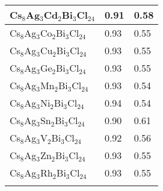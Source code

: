 \documentclass[journal=jpclcd,manuscript=letter]{achemso}
\begin{document}
\begin{longtable}{p{4.2cm} p{2.0cm}p{2.0cm}}
		Cs$_8$Ag$_3$Cd$_2$Bi$_3$Cl$_{24}$&0.91 &0.58\\ \hline
		Cs$_8$Ag$_3$Co$_2$Bi$_3$Cl$_{24}$&0.93 &0.55\\ \hline
		Cs$_8$Ag$_3$Cu$_2$Bi$_3$Cl$_{24}$&0.93 &0.55\\ \hline
		Cs$_8$Ag$_3$Ge$_2$Bi$_3$Cl$_{24}$&0.93 &0.55\\ \hline
		Cs$_8$Ag$_3$Mn$_2$Bi$_3$Cl$_{24}$&0.93&0.54\\ \hline
		Cs$_8$Ag$_3$Ni$_2$Bi$_3$Cl$_{24}$&0.94 &0.54\\ \hline
		Cs$_8$Ag$_3$Sn$_2$Bi$_3$Cl$_{24}$&0.90 &0.61\\ \hline
		Cs$_8$Ag$_3$V$_2$Bi$_3$Cl$_{24}$&0.92 &0.56\\ \hline
		Cs$_8$Ag$_3$Zn$_2$Bi$_3$Cl$_{24}$&0.93 &0.55\\ \hline
		Cs$_8$Ag$_3$Rh$_2$Bi$_3$Cl$_{24}$&0.93 &0.55\\ \hline
		\label{Table4}
\end{longtable}
\newpage
\end{document}
